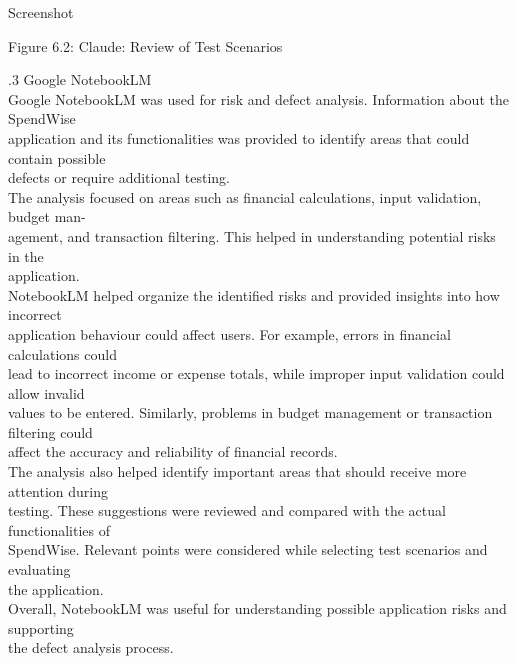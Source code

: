 \documentclass[12pt,a4paper]{report}
\begin{document}
\smallskip
Screenshot\\ 

\smallskip

\smallskip

\smallskip

\smallskip
Figure 6.2: Claude: Review of Test Scenarios\\ 

\smallskip

\smallskip

.3 Google NotebookLM\\ 

\smallskip
Google NotebookLM was used for risk and defect analysis. Information about the SpendWise\\ 
application and its functionalities was provided to identify areas that could contain possible\\ 
defects or require additional testing.\\ 
The analysis focused on areas such as financial calculations, input validation, budget man-\\ 
agement, and transaction filtering. This helped in understanding potential risks in the\\ 
application.\\ 
NotebookLM helped organize the identified risks and provided insights into how incorrect\\ 
application behaviour could affect users. For example, errors in financial calculations could\\ 
lead to incorrect income or expense totals, while improper input validation could allow invalid\\ 
values to be entered. Similarly, problems in budget management or transaction filtering could\\ 
affect the accuracy and reliability of financial records.\\ 
The analysis also helped identify important areas that should receive more attention during\\ 
testing. These suggestions were reviewed and compared with the actual functionalities of\\ 
SpendWise. Relevant points were considered while selecting test scenarios and evaluating\\ 
the application.\\ 
Overall, NotebookLM was useful for understanding possible application risks and supporting\\ 
the defect analysis process.\\ 
\end{document}
